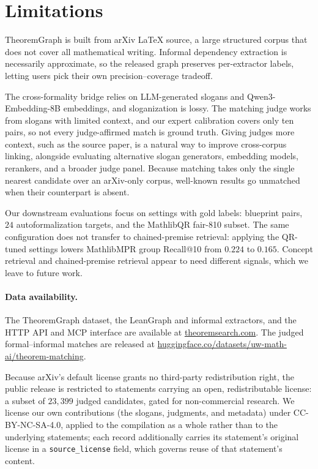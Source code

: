 \section{Limitations}
TheoremGraph is built from arXiv \LaTeX{} source, a large structured corpus that does not cover all mathematical writing. Informal dependency extraction is necessarily approximate, so the released graph preserves per-extractor labels, letting users pick their own precision--coverage tradeoff.

The cross-formality bridge relies on LLM-generated slogans and Qwen3-Embedding-8B embeddings, and sloganization is lossy. The matching judge works from slogans with limited context, and our expert calibration covers only ten pairs, so not every judge-affirmed match is ground truth. Giving judges more context, such as the source paper, is a natural way to improve cross-corpus linking, alongside evaluating alternative slogan generators, embedding models, rerankers, and a broader judge panel. Because matching takes only the single nearest candidate over an arXiv-only corpus, well-known results go unmatched when their counterpart is absent.

Our downstream evaluations focus on settings with gold labels: blueprint pairs, $24$ autoformalization targets, and the MathlibQR fair-810 subset. The same configuration does not transfer to chained-premise retrieval: applying the QR-tuned settings lowers MathlibMPR group Recall@10 from $0.224$ to $0.165$. Concept retrieval and chained-premise retrieval appear to need different signals, which we leave to future work.

\paragraph{Data availability.} The TheoremGraph dataset, the LeanGraph and informal extractors, and the HTTP API and MCP interface are available at \href{https://www.theoremsearch.com}{theoremsearch.com}. The judged formal--informal matches are released at \href{https://huggingface.co/datasets/uw-math-ai/theorem-matching}{huggingface.co/datasets/uw-math-ai/theorem-matching}. 

Because arXiv's default license grants no third-party redistribution right, the public release is restricted to statements carrying an open, redistributable license: a subset of $23{,}399$ judged candidates, gated for non-commercial research. We license our own contributions (the slogans, judgments, and metadata) under CC-BY-NC-SA-4.0, applied to the compilation as a whole rather than to the underlying statements; each record additionally carries its statement's original license in a \texttt{source\_license} field, which governs reuse of that statement's content.